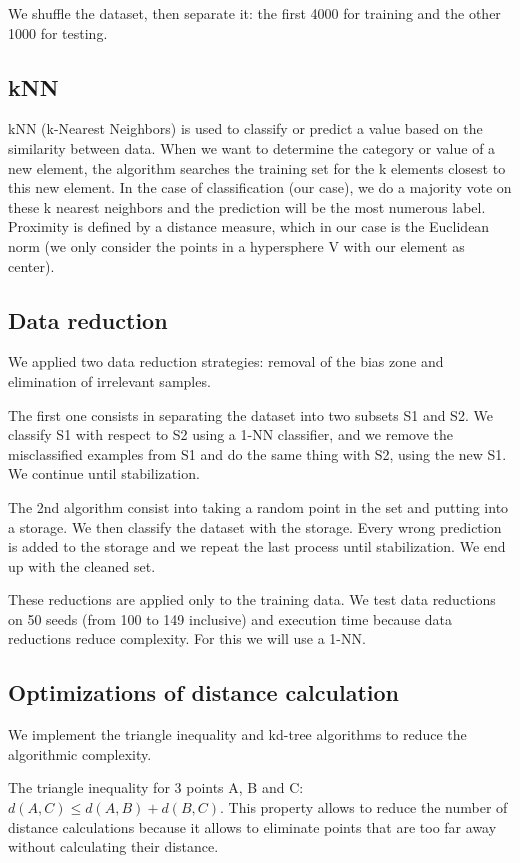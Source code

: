 \documentclass{article}
\theoremstyle{plain}
\theoremstyle{definition}
\theoremstyle{remark}
\begin{document}
We shuffle the dataset, then separate it: the first 4000 for training and the other 1000 for testing.

\subsection{kNN}
kNN (k-Nearest Neighbors) \cite{CoverHart1967} is used to classify or predict a value based on the similarity between data. When we want to determine the category or value of a new element, the algorithm searches the training set for the k elements closest to this new element. In the case of classification (our case), we do a majority vote on these k nearest neighbors and the prediction will be the most numerous label. Proximity is defined by a distance measure, which in our case is the Euclidean norm (we only consider the points in a hypersphere V with our element as center).

\subsection{Data reduction}
We applied two data reduction strategies: removal of the bias zone and elimination of irrelevant samples.

The first one consists in separating the dataset into two subsets S1 and S2. We classify S1 with respect to S2 using a 1-NN classifier, and we remove the misclassified examples from S1 and do the same thing with S2, using the new S1. We continue until stabilization.

The 2nd algorithm consist into taking a random point in the set and putting into a storage. We then classify the dataset with the storage. Every wrong prediction is added to the storage and we repeat the last process until stabilization. We end up with the cleaned set.

These reductions are applied only to the training data. We test data reductions on 50 seeds (from 100 to 149 inclusive) and execution time because data reductions reduce complexity. For this we will use a 1-NN.

\subsection{Optimizations of distance calculation}
 We implement the triangle inequality \cite{MorenoSeco2002} and kd-tree \cite{FriedmanBentleyFinkel1977} algorithms to reduce the algorithmic complexity.

 The triangle inequality for 3 points A, B and C: $d(A,C) \leq d(A,B)+d(B,C)$. This property allows to reduce the number of distance calculations because it allows to eliminate points that are too far away without calculating their distance.
\end{document}

